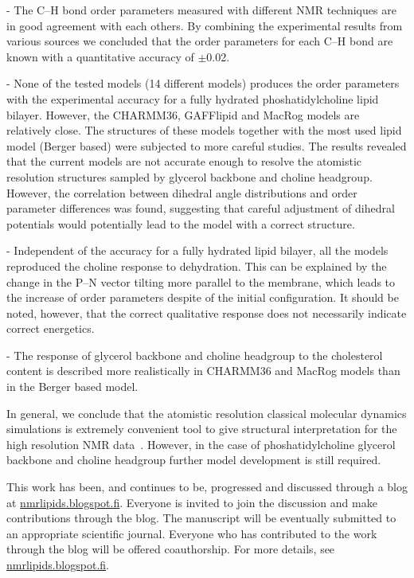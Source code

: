 \documentclass[pre,aps,floatfix,authordate1-4,twocolumn]{revtex4-1}
\begin{document}
- The C--H bond order parameters measured with different NMR techniques are in good agreement
with each others. By combining the experimental results from various sources we concluded
that the order parameters for each C--H bond are known with a quantitative accuracy of $\pm$0.02.

- None of the tested models (14 different models) produces the order parameters with the experimental
accuracy for a fully hydrated phoshatidylcholine lipid bilayer. However, the CHARMM36, GAFFlipid and MacRog 
models are relatively close. The structures of these models together with the most used lipid model (Berger based) 
were subjected to more careful studies. The results revealed that the current models are not accurate
enough to resolve the atomistic resolution structures sampled by glycerol backbone and choline headgroup.  
However, the correlation between dihedral angle distributions and order parameter differences was found, 
suggesting that careful adjustment of dihedral potentials would potentially lead to the model with a correct
structure.

- Independent of the accuracy for a fully hydrated lipid bilayer, all the models reproduced the choline response
to dehydration. This can be explained by the change in the P--N vector tilting more parallel to the membrane,
which leads to the increase of order parameters despite of the initial configuration. It should be noted, however,
that the correct qualitative response does not necessarily indicate correct energetics. 

- The response of glycerol backbone and choline headgroup to the cholesterol content is described more
realistically in CHARMM36 and MacRog models than in the Berger based model.

In general, we conclude that the atomistic resolution classical molecular dynamics simulations 
is extremely convenient tool to give structural interpretation for the high resolution NMR data~\cite{ferreira14}. 
However, in the case of phoshatidylcholine glycerol backbone and choline headgroup further model development is still required.

This work has been, and continues to be, progressed and discussed through a blog at \url{nmrlipids.blogspot.fi}. 
Everyone is invited to join the discussion and make contributions through the blog. 
The manuscript will be eventually submitted to an appropriate scientific journal. 
Everyone who has contributed to the work through the blog will be offered 
coauthorship. For more details, see \url{nmrlipids.blogspot.fi}. 
\end{document}
